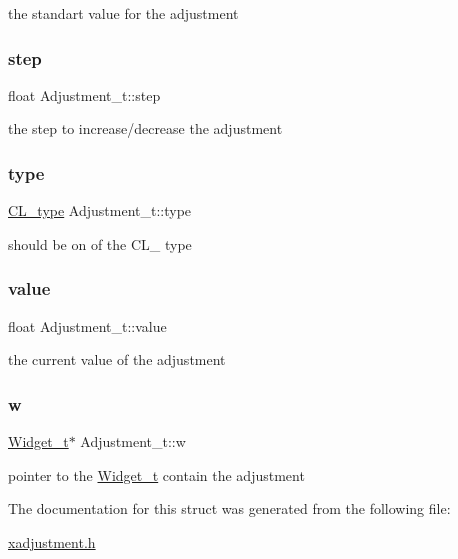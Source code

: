 the standart value for the adjustment \mbox{\label{structAdjustment__t_a0198d0a412f8642b3e8a308f9240d467}} 
\subsubsection{\texorpdfstring{step}{step}}
{\footnotesize\ttfamily float Adjustment\+\_\+t\+::step}

the step to increase/decrease the adjustment \mbox{\label{structAdjustment__t_a1ec53b702dc4707522249f3cb5cbf6b3}} 
\subsubsection{\texorpdfstring{type}{type}}
{\footnotesize\ttfamily \hyperlink{xadjustment_8h_aefe5e135b1a0eab4675337a0967a7743}{C\+L\+\_\+type} Adjustment\+\_\+t\+::type}

should be on of the C\+L\+\_\+ type \mbox{\label{structAdjustment__t_acb1f8fb06d9e505f9f50e9178256215c}} 
\subsubsection{\texorpdfstring{value}{value}}
{\footnotesize\ttfamily float Adjustment\+\_\+t\+::value}

the current value of the adjustment \mbox{\label{structAdjustment__t_a82c03e6ceb092314a75bd10ba918f9d7}} 
\subsubsection{\texorpdfstring{w}{w}}
{\footnotesize\ttfamily \hyperlink{structWidget__t}{Widget\+\_\+t}$\ast$ Adjustment\+\_\+t\+::w}

pointer to the \hyperlink{structWidget__t}{Widget\+\_\+t} contain the adjustment 

The documentation for this struct was generated from the following file\+:\begin{DoxyCompactItemize}
\item 
\hyperlink{xadjustment_8h}{xadjustment.\+h}\end{DoxyCompactItemize}

